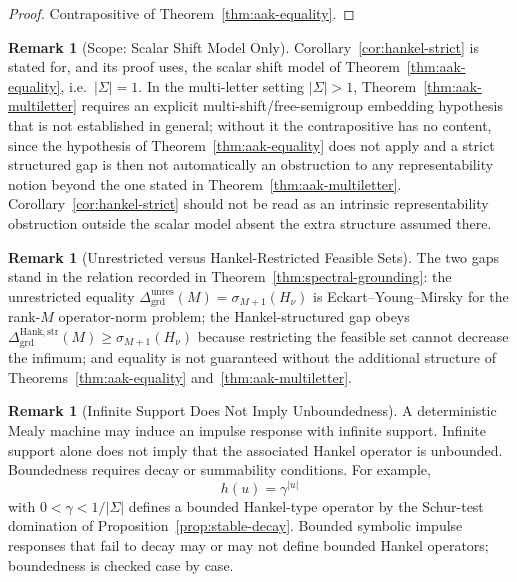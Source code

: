 \documentclass[12pt]{article}
\theoremstyle{definition}
\newtheorem{remark}[theorem]{Remark}
\newcommand{\Dunres}{\Delta_{\mathrm{grd}}^{\mathrm{unres}}}
\newcommand{\DHankstr}{\Delta_{\mathrm{grd}}^{\mathrm{Hank,str}}}
\begin{document}
\begin{proof}
Contrapositive of Theorem~\ref{thm:aak-equality}.
\end{proof}

\begin{remark}[Scope: Scalar Shift Model Only]
\label{rem:hankel-strict-scope}
Corollary~\ref{cor:hankel-strict} is stated for, and its proof uses, the
scalar shift model of Theorem~\ref{thm:aak-equality}, i.e.\ $|\Sigma|=1$.  In
the multi-letter setting $|\Sigma|>1$, Theorem~\ref{thm:aak-multiletter}
requires an explicit multi-shift/free-semigroup embedding hypothesis that is
not established in general; without it the contrapositive has no content,
since the hypothesis of Theorem~\ref{thm:aak-equality} does not apply and a
strict structured gap is then not automatically an obstruction to any
representability notion beyond the one stated in
Theorem~\ref{thm:aak-multiletter}.  Corollary~\ref{cor:hankel-strict} should
not be read as an intrinsic representability obstruction outside the scalar
model absent the extra structure assumed there.
\end{remark}

\begin{remark}[Unrestricted versus Hankel-Restricted Feasible Sets]
\label{rem:grounding-unrestricted-restricted}
The two gaps stand in the relation recorded in
Theorem~\ref{thm:spectral-grounding}: the unrestricted equality
$\Dunres(M)=\sigma_{M+1}(H_\nu)$ is Eckart--Young--Mirsky for the rank-$M$
operator-norm problem; the Hankel-structured gap obeys
$\DHankstr(M)\ge\sigma_{M+1}(H_\nu)$ because restricting the feasible set
cannot decrease the infimum; and equality is not guaranteed without the
additional structure of Theorems~\ref{thm:aak-equality}
and~\ref{thm:aak-multiletter}.
\end{remark}

\begin{remark}[Infinite Support Does Not Imply Unboundedness]
\label{rem:infinite-support-grounding}
A deterministic Mealy machine may induce an impulse response with infinite
support.  Infinite support alone does not imply that the associated Hankel
operator is unbounded.  Boundedness requires decay or summability conditions.
For example,
\[
h(u)=\gamma^{|u|}
\]
with $0<\gamma<1/|\Sigma|$ defines a bounded Hankel-type operator by the
Schur-test domination of Proposition~\ref{prop:stable-decay}.  Bounded symbolic
impulse responses that fail to decay may or may not define bounded Hankel
operators; boundedness is checked case by case.
\end{remark}
\end{document}
